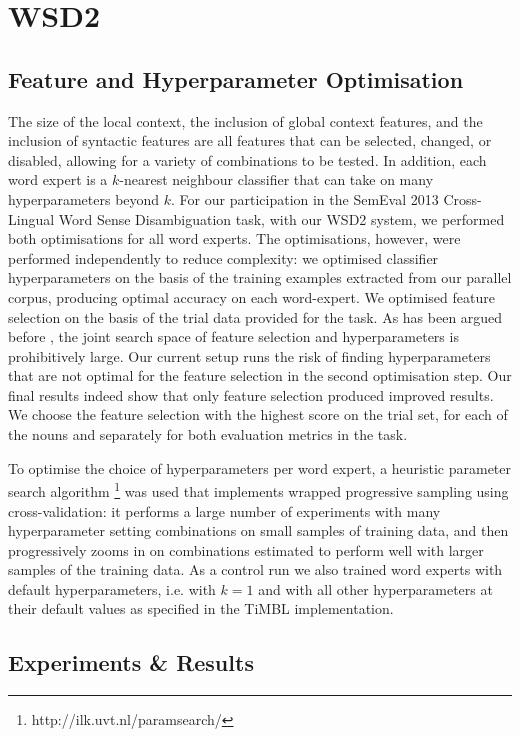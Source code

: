 \section{WSD2}
\label{sec:wsd2}

\subsection{Feature and Hyperparameter Optimisation}

The size of the local context, the inclusion of global context features, and
the inclusion of syntactic features are all features that can be selected,
changed, or disabled, allowing for a variety of combinations to be tested. In
addition, each word expert is a $k$-nearest neighbour classifier that can take
on many hyperparameters beyond $k$. For our participation in the SemEval 2013
Cross-Lingual Word Sense Disambiguation task, with our WSD2 system, we performed both
optimisations for all word experts. The optimisations, however, were performed
independently to reduce complexity: we optimised classifier hyperparameters on
the basis of the training examples extracted from our parallel corpus,
producing optimal accuracy on each word-expert. We optimised feature selection
on the basis of the trial data provided for the task. As has been argued before
\citep{Hoste+02}, the joint search space of feature selection and
hyperparameters is prohibitively large. Our current setup runs the risk of
finding hyperparameters that are not optimal for the feature selection in the
second optimisation step. Our final results indeed show that only feature
selection produced improved results. We choose the feature selection with the
highest score on the trial set, for each of the nouns and separately for both
evaluation metrics in the task.

To optimise the choice of hyperparameters per word expert, a heuristic
parameter search algorithm
\citep{PARAMSEARCH}\footnote{http://ilk.uvt.nl/paramsearch/} was used that
implements wrapped progressive sampling using cross-validation: it performs a
large number of experiments with many hyperparameter setting combinations on
small samples of training data, and then progressively zooms in on combinations
estimated to perform well with larger samples of the training data. As a
control run we also trained word experts with default hyperparameters, i.e.
with $k=1$ and with all other hyperparameters at their default values as
specified in the TiMBL implementation.

\subsection{Experiments \& Results}

